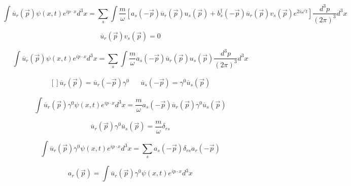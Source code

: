 \documentclass[a4]{article}
\begin{document}
    \begin{equation}
        \int \overline{u}_{r} (\vec{p}) \psi (x, t) e^{i p \cdot x} d^3 x = \sum_{s} \int \frac{m}{\omega} [a_s (- \vec{p}) \overline{u}_{r} (\vec{p}) u_s (\vec{p}) + b^{\dagger}_s (- \vec{p}) \overline{u}_{r} (\vec{p}) v_s (\vec{p}) e ^{2 i \omega' t}] \frac{d^{3} p}{(2 \pi)^3} d^3 x
    \end{equation}

    \begin{equation}
        \overline{u}_{r} (\vec{p}) v_{s} (\vec{p}) = 0
    \end{equation}

    \begin{equation}
        \int \overline{u}_{r} (\vec{p}) \psi (x, t) e^{i p \cdot x} d^3 x = \sum_{s} \int \frac{m}{\omega} a_s (- \vec{p}) \overline{u}_{r} (\vec{p}) u_s (\vec{p}) \frac{d^{3} p}{(2 \pi)^3} d^3 x
    \end{equation}

    \begin{equation}
        \begin{aligned}[]
            \overline{u}_{r} (\vec{p}) = \overline{u}_{r} (- \vec{p}) \gamma^0 & & \overline{u}_{s} (- \vec{p}) = \gamma^0 \overline{u}_{s} (\vec{p})
        \end{aligned}
    \end{equation}

    \begin{equation}
        \int \overline{u}_{r} (\vec{p}) \gamma^0 \psi (x, t) e^{i p \cdot x} d^3 x = \frac{m}{\omega} a_s (- \vec{p}) \overline{u}_{r} (\vec{p}) \gamma^0 \overline{u}_{s} (\vec{p})
    \end{equation}

    \begin{equation}
        \overline{u}_{r} (\vec{p}) \gamma^0 \overline{u}_{s} (\vec{p}) = \frac{m}{\omega} \delta_{rs}
    \end{equation}

    \begin{equation}
        \int \overline{u}_{r} (\vec{p}) \gamma^0 \psi (x, t) e^{i p \cdot x} d^3 x = \sum_s a_s (- \vec{p}) \delta_{rs} a_r (- \vec{p})
    \end{equation}

    \begin{framed}
        \begin{equation}
            a_r (\vec{p}) = \int \overline{u}_{r} (\vec{p}) \gamma^0 \psi (x, t) e^{i p \cdot x} d^3 x
        \end{equation}
    \end{framed}
\end{document}
